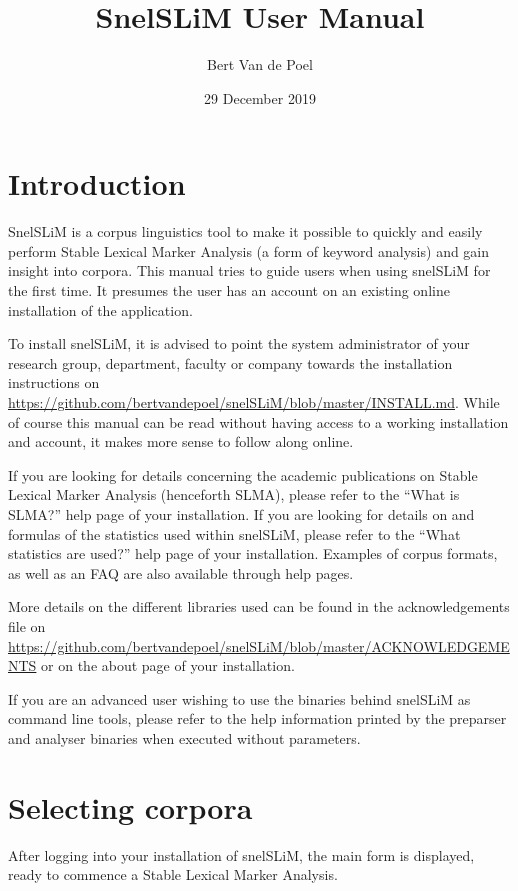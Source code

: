 \documentclass[11pt,a4paper]{article}
\title{SnelSLiM User Manual}
\author{Bert Van de Poel}
\date{29 December 2019}
\begin{document}
\maketitle

\tableofcontents

\newpage

\section{Introduction}

SnelSLiM is a corpus linguistics tool to make it possible to quickly and easily perform Stable Lexical Marker Analysis (a form of keyword analysis) and gain insight into corpora. This manual tries to guide users when using snelSLiM for the first time. It presumes the user has an account on an existing online installation of the application.

To install snelSLiM, it is advised to point the system administrator of your research group, department, faculty or company towards the installation instructions on \url{https://github.com/bertvandepoel/snelSLiM/blob/master/INSTALL.md}. While of course this manual can be read without having access to a working installation and account, it makes more sense to follow along online. 

If you are looking for details concerning the academic publications on Stable Lexical Marker Analysis (henceforth SLMA), please refer to the ``What is SLMA?'' help page of your installation. If you are looking for details on and formulas of the statistics used within snelSLiM, please refer to the ``What statistics are used?'' help page of your installation. Examples of corpus formats, as well as an FAQ are also available through help pages.

More details on the different libraries used can be found in the acknowledgements file on \url{https://github.com/bertvandepoel/snelSLiM/blob/master/ACKNOWLEDGEMENTS} or on the about page of your installation.

If you are an advanced user wishing to use the binaries behind snelSLiM as command line tools, please refer to the help information printed by the preparser and analyser binaries when executed without parameters.

\section{Selecting corpora}

After logging into your installation of snelSLiM, the main form is displayed, ready to commence a Stable Lexical Marker Analysis. 
\end{document}
